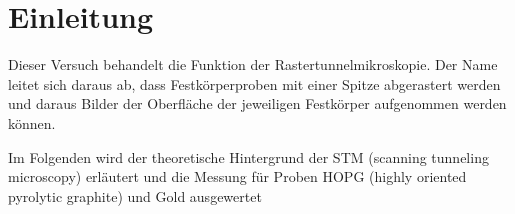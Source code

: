 \section{Einleitung}
Dieser Versuch behandelt die Funktion der Rastertunnelmikroskopie. Der Name leitet sich daraus ab, dass Festkörperproben mit einer Spitze abgerastert werden und daraus Bilder der Oberfläche der jeweiligen Festkörper aufgenommen werden können.

\noindent Im Folgenden wird der theoretische Hintergrund der STM (scanning tunneling microscopy) erläutert und die Messung für Proben HOPG (highly oriented pyrolytic graphite) und Gold ausgewertet